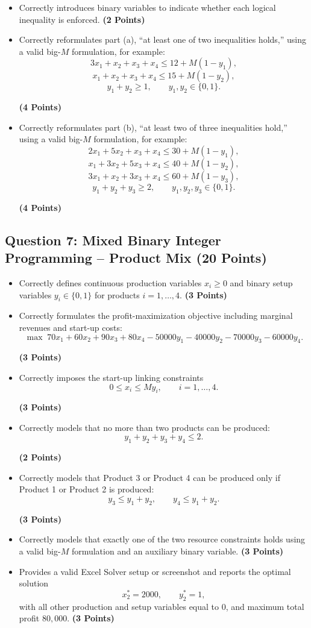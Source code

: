 \documentclass[11pt, letterpaper]{article}
\newcommand{\question}[2]{
    \subsection*{Question #1: #2}
}
\newcommand{\points}[1]{
    \textbf{(#1 Points)}
}
\begin{document}
\begin{itemize}
    \item Correctly introduces binary variables to indicate whether each logical
    inequality is enforced. \points{2}

    \item Correctly reformulates part (a), ``at least one of two inequalities
    holds,'' using a valid big-$M$ formulation, for example:
    \[
    3x_1+x_2+x_3+x_4 \leq 12+M(1-y_1),
    \]
    \[
    x_1+x_2+x_3+x_4 \leq 15+M(1-y_2),
    \]
    \[
    y_1+y_2\geq 1,\qquad y_1,y_2\in\{0,1\}.
    \]
    \points{4}

    \item Correctly reformulates part (b), ``at least two of three inequalities
    hold,'' using a valid big-$M$ formulation, for example:
    \[
    2x_1+5x_2+x_3+x_4 \leq 30+M(1-y_1),
    \]
    \[
    x_1+3x_2+5x_3+x_4 \leq 40+M(1-y_2),
    \]
    \[
    3x_1+x_2+3x_3+x_4 \leq 60+M(1-y_3),
    \]
    \[
    y_1+y_2+y_3\geq 2,\qquad y_1,y_2,y_3\in\{0,1\}.
    \]
    \points{4}
\end{itemize}


\question{7}{Mixed Binary Integer Programming -- Product Mix \points{20}}

\begin{itemize}
    \item Correctly defines continuous production variables $x_i\geq 0$ and binary
    setup variables $y_i\in\{0,1\}$ for products $i=1,\ldots,4$. \points{3}

    \item Correctly formulates the profit-maximization objective including marginal
    revenues and start-up costs:
    \[
    \max \; 70x_1+60x_2+90x_3+80x_4
    -50000y_1-40000y_2-70000y_3-60000y_4.
    \]
    \points{3}

    \item Correctly imposes the start-up linking constraints
    \[
    0\leq x_i\leq My_i,\qquad i=1,\ldots,4.
    \]
    \points{3}

    \item Correctly models that no more than two products can be produced:
    \[
    y_1+y_2+y_3+y_4\leq 2.
    \]
    \points{2}

    \item Correctly models that Product 3 or Product 4 can be produced only if
    Product 1 or Product 2 is produced:
    \[
    y_3\leq y_1+y_2,\qquad y_4\leq y_1+y_2.
    \]
    \points{3}

    \item Correctly models that exactly one of the two resource constraints holds
    using a valid big-$M$ formulation and an auxiliary binary variable. \points{3}

    \item Provides a valid Excel Solver setup or screenshot and reports the optimal
    solution
    \[
    x_2^*=2000,\qquad y_2^*=1,
    \]
    with all other production and setup variables equal to 0, and maximum total
    profit $80{,}000$. \points{3}
\end{itemize}
\end{document}
